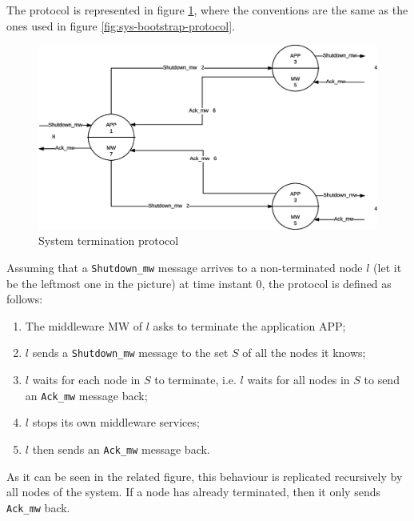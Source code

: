 The protocol is represented in figure \ref{fig:sys-termination-protocol}, where
the conventions are the same as the ones used in figure
\ref{fig:sys-bootstrap-protocol}.

\begin{figure}[H]
  \centering
  \includegraphics[width=\columnwidth]{sections/images/solution/termination.eps}
  \caption{System termination protocol}
  \label{fig:sys-termination-protocol}
\end{figure}

Assuming that a \texttt{Shutdown\_mw} message arrives to a non-terminated node
$l$ (let it be the leftmost one in the picture) at time instant 0, the protocol
is defined as follows:

\begin{enumerate}
  \item The middleware MW of $l$ asks to terminate the application APP;
  \item $l$ sends a \texttt{Shutdown\_mw} message to the set
    $S$ of all the nodes it knows;
  \item $l$ waits for each node in $S$ to terminate, i.e. $l$ waits for all
    nodes in $S$ to send an \texttt{Ack\_mw} message back;
  \item $l$ stops its own middleware services;
  \item $l$ then sends an \texttt{Ack\_mw} message back.
\end{enumerate}

As it can be seen in the related figure, this behaviour is replicated
recursively by all nodes of the system. If a node has already terminated, then
it only sends \texttt{Ack\_mw} back.
